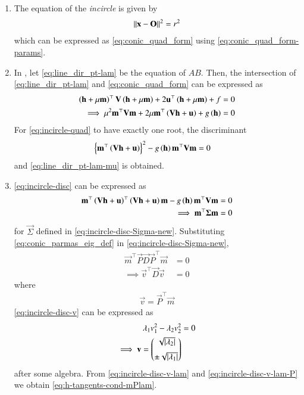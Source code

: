 \begin{enumerate}[label=\thesubsection.\arabic*,ref=\thesubsection.\theenumi]
	\item The equation of the {\em incircle} is given by 
		\begin{align}
			\label{eq:incircle}
			\left\lVert\mathbf{x}-\mathbf{O}\right\rVert^2 = r^2
		\end{align}
		which can be expressed as 
			 \eqref{eq:conic_quad_form}
			 using 
			 \eqref{eq:conic_quad_form-params}.
		 \item 	In , 
let 
  \eqref{eq:line_dir_pt-lam}
  be the equation of $AB$.  Then, the intersection of 
  \eqref{eq:line_dir_pt-lam}
  and 
			 \eqref{eq:conic_quad_form}
			 can be expressed as 
\begin{align}
\left(\mathbf{h} + \mu{\mathbf{m}}\right)^{\top}
\mathbf{V}
\left(\mathbf{h} + \mu{\mathbf{m}}\right)
			+2\mathbf{u}^{\top}\left(\mathbf{h} + \mu{\mathbf{m}}\right)+f &= 0
			\\
\implies \mu^2\mathbf{m}^{\top} \mathbf{V}\mathbf{m} + 2\mu \mathbf{m}^{\top}\left(\mathbf{V}\mathbf{h}+\mathbf{u}\right)+g\left(\mathbf{h}\right) &= 0 
	\label{eq:incircle-quad}
\end{align}
For 	\eqref{eq:incircle-quad} to have exactly one root, the discriminant
\begin{align}
 \left\{\mathbf{m}^{\top}\left(\mathbf{V}\mathbf{h}+\mathbf{u}\right)\right\}^2 -g\left(\mathbf{h}\right)\mathbf{m}^{\top} \mathbf{V}\mathbf{m}  &= 0 
	\label{eq:incircle-disc}
\end{align}
and 
  \eqref{eq:line_dir_pt-lam-mu}
  is obtained.
  \item 
	\eqref{eq:incircle-disc}
	can be expressed as
\begin{align}
\mathbf{m}^{\top}\left(\mathbf{V}\mathbf{h}+\mathbf{u}\right)^{\top}\left(\mathbf{V}\mathbf{h}+\mathbf{u}\right)\mathbf{m}-g\left(\mathbf{h}\right)\mathbf{m}^{\top} \mathbf{V}\mathbf{m}  &= 0 
\\
\implies \mathbf{m}^{\top}\mathbf{\Sigma}\mathbf{m} &= 0
	\label{eq:incircle-disc-Sigma-new}
\end{align}
for $\vec{\Sigma}$ defined in 
	\eqref{eq:incircle-disc-Sigma-new}.
      Substituting \eqref{eq:conic_parmas_eig_def}
	in \eqref{eq:incircle-disc-Sigma-new},
\begin{align}
\vec{m}^{\top}\vec{P}\vec{D}\vec{P}^{\top}\vec{m} &= 0
\\
\implies 
\vec{v}^{\top}\vec{D}\vec{v} &= 0
	\label{eq:incircle-disc-v}
\end{align}
where 
\begin{align}
	\label{eq:incircle-disc-v-lam-P}
\vec{v} = \vec{P}^{\top}\vec{m}
\end{align}
	\eqref{eq:incircle-disc-v}
	can be expressed as 
\begin{align}
\lambda_1 v_1^2
-\lambda_2 v_2^2 &= 0
\\
\implies \mathbf{v} = \begin{pmatrix}\sqrt{\left\vert\lambda_2\right\vert} \\[2mm]  \pm \sqrt{\left\vert\lambda_1\right\vert}\end{pmatrix}
	\label{eq:incircle-disc-v-lam}
\end{align}
after some algebra.
From 
	\eqref{eq:incircle-disc-v-lam}
	and
	\eqref{eq:incircle-disc-v-lam-P}
	we obtain 
	  \eqref{eq:h-tangents-cond-mPlam}.
	  \end{enumerate}
